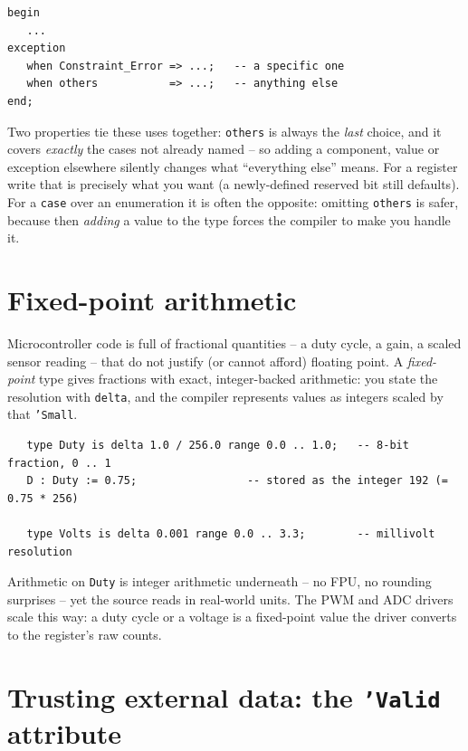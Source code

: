 \begin{lstlisting}
begin
   ...
exception
   when Constraint_Error => ...;   -- a specific one
   when others           => ...;   -- anything else
end;
\end{lstlisting}

Two properties tie these uses together: \texttt{others} is always the \emph{last}
choice, and it covers \emph{exactly} the cases not already named -- so adding a
component, value or exception elsewhere silently changes what ``everything else''
means. For a register write that is precisely what you want (a newly-defined
reserved bit still defaults). For a \texttt{case} over an enumeration it is often
the opposite: omitting \texttt{others} is safer, because then \emph{adding} a value
to the type forces the compiler to make you handle it.

\section{Fixed-point arithmetic}
\label{sec:fixed}

Microcontroller code is full of fractional quantities -- a duty cycle, a gain, a
scaled sensor reading -- that do not justify (or cannot afford) floating point.
A \emph{fixed-point} type gives fractions with exact, integer-backed arithmetic:
you state the resolution with \texttt{delta}, and the compiler represents values
as integers scaled by that \texttt{'Small}.

\begin{lstlisting}
   type Duty is delta 1.0 / 256.0 range 0.0 .. 1.0;   -- 8-bit fraction, 0 .. 1
   D : Duty := 0.75;                 -- stored as the integer 192 (= 0.75 * 256)

   type Volts is delta 0.001 range 0.0 .. 3.3;        -- millivolt resolution
\end{lstlisting}

Arithmetic on \texttt{Duty} is integer arithmetic underneath -- no FPU, no
rounding surprises -- yet the source reads in real-world units. The PWM and ADC
drivers scale this way: a duty cycle or a voltage is a fixed-point value the
driver converts to the register's raw counts.

\section{Trusting external data: the \texttt{'Valid} attribute}
\label{sec:valid}

